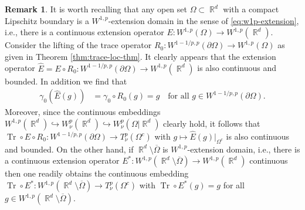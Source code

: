 \documentclass[12pt, reqno]{amsart}%
\theoremstyle{plain}  %
\theoremstyle{definition}  %
\newtheorem{remark}[theorem]{Remark}   %
\numberwithin{equation}{section}
\DeclareMathOperator{\R}{\mathbb{R}}
\newcommand{\WnuOmR}{W^{p}_{\nu}(\Omega|\R^d )}
\newcommand{\TnuOm}{T^{p}_{\nu} (\Omega^c)}
\begin{document}
\begin{remark}\label{rem:ext-plus-trace}
It is worth recalling that any open set $\Omega\subset \R^d$ with a compact Lipschitz boundary is a $W^{1,p}$-extension domain in the sense of \eqref{eq:w1p-extension}, i.e., there  is a continuous extension operator $E: W^{1,p}(\Omega)\to W^{1,p}(\R^d)$. Consider the lifting of the trace operator
$R_0: W^{1-1/p ,p}(\partial\Omega)\to W^{1,p}(\Omega)$ as given in Theorem \ref{thm:trace-loc-thm}. It clearly appears that the extension operator $\widehat{E}=E\circ R_0: W^{1-1/p ,p}(\partial\Omega)\to W^{1,p}(\R^d)$ is also continuous and bounded. In addition we find that
\begin{align*}
\gamma_0(\widehat{E} (g)) &= \gamma_0\circ R_0 (g)= g\quad\text{for all $g\in W^{1-1/p ,p}(\partial\Omega)$}.
\end{align*}
Moreover, since the continuous embeddings $W^{1,p}(\R^d) \hookrightarrow W^{p}_\nu(\R^d) \hookrightarrow \WnuOmR$ clearly hold, it follows  that $\operatorname{Tr}\circ E\circ R_0: W^{1-1/p ,p}(\partial\Omega)\to \TnuOm $ with $g\mapsto  \widehat{E}(g)|_{\Omega^c}$ is also continuous and bounded.
On the other hand, if $\R^d\setminus \overline{\Omega}$ is $W^{1,p}$-extension domain, i.e., there  is a continuous extension operator $E^*:W^{1,p}(\R^d\setminus \overline{\Omega})\to W^{1,p}(\R^d)$ continuous then one readily obtains the continuous embedding $\operatorname{Tr}\circ E^* : W^{1,p}(\R^d\setminus \overline{\Omega})\to \TnuOm$ with $\operatorname{Tr}\circ E^* (g) = g$
for all $g\in W^{1,p}(\R^d\setminus \overline{\Omega})$.
\end{remark}
\end{document}
